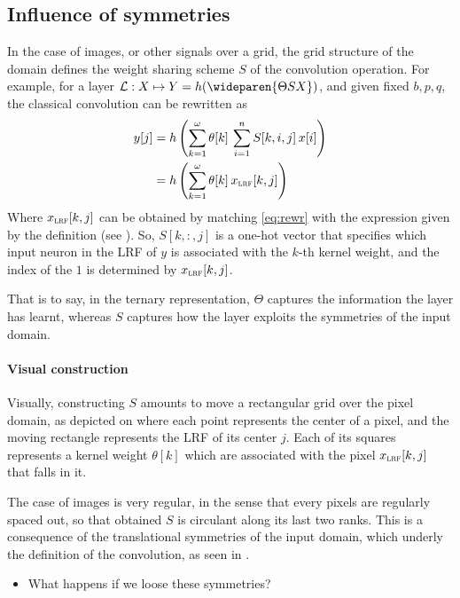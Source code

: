 \subsection{Influence of symmetries}
\label{sec:sym}

In the case of images, or other signals over a grid, the grid structure of the domain defines the weight sharing scheme $S$ of the convolution operation. For example, for a layer $\cl : X  \mapsto Y = h(\wideparen{\Theta S X})$, and given fixed $b,p,q$, the classical convolution can be rewritten as
\begin{align}
y[j] &= h\left(\displaystyle \sum_{k=1}^{\omega} \theta[k] \h{2} \sum_{i=1}^n S[k,i,j] \h{2} x[i] \right)\\
&= h\left(\displaystyle \sum_{k=1}^{\omega} \theta[k] \h{2} x_{\LRF}[k,j] \right) \label{eq:rewr}
\end{align}
Where $x_{\LRF}[k,j]$ can be obtained by matching \eqref{eq:rewr} with the expression given by the definition (see ). So, $S[k,:,j]$ is a one-hot vector that specifies which input neuron in the LRF of $y$ is associated with the $k$-th kernel weight, and the index of the $1$ is determined by $x_{\LRF}[k,j]$.

That is to say, in the ternary representation, $\Theta$ captures the information the layer has learnt, whereas $S$ captures how the layer exploits the symmetries of the input domain.

\paragraph{Visual construction}
Visually, constructing $S$ amounts to move a rectangular grid over the pixel domain, as depicted on  where each point represents the center of a pixel, and the moving rectangle represents the LRF of its center $j$. Each of its squares represents a kernel weight $\theta[k]$ which are associated with the pixel $x_{\LRF}[k,j]$ that falls in it.



The case of images is very regular, in the sense that every pixels are regularly spaced out, so that obtained $S$ is circulant along its last two ranks. This is a consequence of the translational symmetries of the input domain, which underly the definition of the convolution, as seen in .
\begin{itemize}
\item What happens if we loose these symmetries?
\end{itemize}

